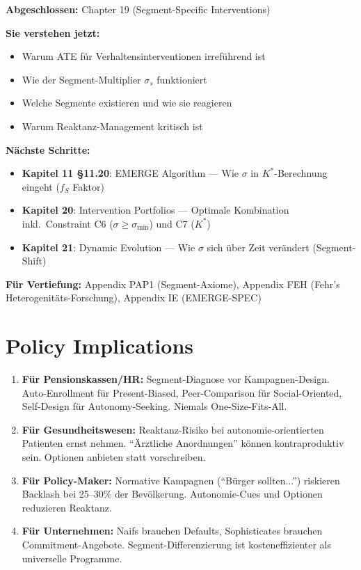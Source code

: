 \begin{tcolorbox}[colback=gray!5!white, colframe=gray!75!black,
    title=Empfohlene Lesepfade]

\textbf{Abgeschlossen:} Chapter 19 (Segment-Specific Interventions)

\textbf{Sie verstehen jetzt:}
\begin{itemize}[nosep]
\item Warum ATE für Verhaltensinterventionen irreführend ist
\item Wie der Segment-Multiplier $\sigma_s$ funktioniert
\item Welche Segmente existieren und wie sie reagieren
\item Warum Reaktanz-Management kritisch ist
\end{itemize}

\textbf{Nächste Schritte:}
\begin{itemize}[nosep]
\item \textbf{Kapitel 11 §11.20}: EMERGE Algorithm --- Wie $\sigma$ in $K^*$-Berechnung eingeht ($f_S$ Faktor)
\item \textbf{Kapitel 20}: Intervention Portfolios --- Optimale Kombination inkl.\ Constraint C6 ($\sigma \geq \sigma_{\min}$) und C7 ($K^*$)
\item \textbf{Kapitel 21}: Dynamic Evolution --- Wie $\sigma$ sich über Zeit verändert (Segment-Shift)
\end{itemize}

\textbf{Für Vertiefung:} Appendix PAP1 (Segment-Axiome), Appendix FEH (Fehr's Heterogenitäts-Forschung), Appendix IE (EMERGE-SPEC)
\end{tcolorbox}



\section*{Policy Implications}

\begin{enumerate}
\item \textbf{Für Pensionskassen/HR:} Segment-Diagnose vor Kampagnen-Design. Auto-Enrollment für Present-Biased, Peer-Comparison für Social-Oriented, Self-Design für Autonomy-Seeking. Niemals One-Size-Fits-All.

\item \textbf{Für Gesundheitswesen:} Reaktanz-Risiko bei autonomie-orientierten Patienten ernst nehmen. ``Ärztliche Anordnungen'' können kontraproduktiv sein. Optionen anbieten statt vorschreiben.

\item \textbf{Für Policy-Maker:} Normative Kampagnen (``Bürger sollten...'') riskieren Backlash bei 25--30\% der Bevölkerung. Autonomie-Cues und Optionen reduzieren Reaktanz.

\item \textbf{Für Unternehmen:} Naifs brauchen Defaults, Sophisticates brauchen Commitment-Angebote. Segment-Differenzierung ist kosteneffizienter als universelle Programme.
\end{enumerate}


